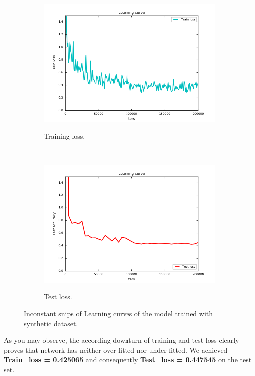 \begin{figure}[h!]
    \centering
    \begin{subfigure}[t]{0.5\textwidth}
        \centering
        {\includegraphics[width=1\textwidth]{images/train_U}}
        \caption{Training loss. }
    \end{subfigure}%
    ~ 
    \begin{subfigure}[t]{0.5\textwidth}
        \centering
        {\includegraphics[width=1\textwidth]{images/test_U}}
        \caption{Test loss.}
    \end{subfigure}
    \caption{Inconstant snips of Learning curves of the model trained with synthetic dataset. }
    \label{fig:ucurve}
\end{figure}

As you may observe, the according downturn of training and test loss clearly proves that network has neither over-fitted nor under-fitted. We achieved \textbf{Train\_loss = 0.425065} and consequently \textbf{Test\_loss = 0.447545} on the test set.

